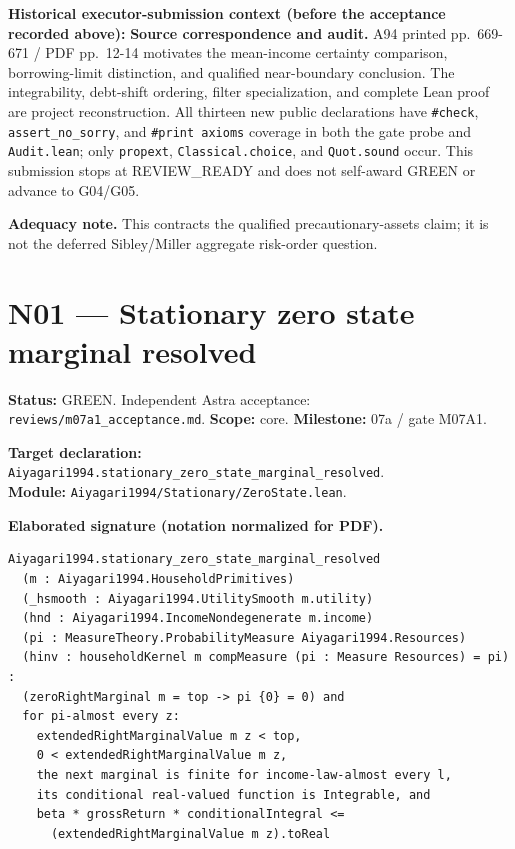 \documentclass[
  11pt,
]{article}
\let\LedgerOriginalTexttt\texttt
\renewcommand{\texttt}[1]{{\small\LedgerOriginalTexttt{#1}}}
\begin{document}
\textbf{Historical executor-submission context (before the acceptance
recorded above):} \textbf{Source correspondence and audit.} A94 printed
pp.~669-671 / PDF pp.~12-14 motivates the mean-income certainty
comparison, borrowing-limit distinction, and qualified near-boundary
conclusion. The integrability, debt-shift ordering, filter
specialization, and complete Lean proof are project reconstruction. All
thirteen new public declarations have \texttt{\#check},
\texttt{assert\_no\_sorry}, and \texttt{\#print\ axioms} coverage in
both the gate probe and \texttt{Audit.lean}; only \texttt{propext},
\texttt{Classical.choice}, and \texttt{Quot.sound} occur. This
submission stops at REVIEW\_READY and does not self-award GREEN or
advance to G04/G05.

\textbf{Adequacy note.} This contracts the qualified
precautionary-assets claim; it is not the deferred Sibley/Miller
aggregate risk-order question.

\section{N01 --- Stationary zero state marginal
resolved}\label{n01-stationary-zero-state-marginal-resolved}

\textbf{Status:} GREEN. Independent Astra acceptance:
\texttt{reviews/m07a1\_acceptance.md}. \textbf{Scope:} core.
\textbf{Milestone:} 07a / gate M07A1.

\textbf{Target declaration:}
\texttt{Aiyagari1994.stationary\_zero\_state\_marginal\_resolved}.\\
\textbf{Module:} \texttt{Aiyagari1994/Stationary/ZeroState.lean}.

\textbf{Elaborated signature (notation normalized for PDF).}

\begin{verbatim}
Aiyagari1994.stationary_zero_state_marginal_resolved
  (m : Aiyagari1994.HouseholdPrimitives)
  (_hsmooth : Aiyagari1994.UtilitySmooth m.utility)
  (hnd : Aiyagari1994.IncomeNondegenerate m.income)
  (pi : MeasureTheory.ProbabilityMeasure Aiyagari1994.Resources)
  (hinv : householdKernel m compMeasure (pi : Measure Resources) = pi) :
  (zeroRightMarginal m = top -> pi {0} = 0) and
  for pi-almost every z:
    extendedRightMarginalValue m z < top,
    0 < extendedRightMarginalValue m z,
    the next marginal is finite for income-law-almost every l,
    its conditional real-valued function is Integrable, and
    beta * grossReturn * conditionalIntegral <=
      (extendedRightMarginalValue m z).toReal
\end{verbatim}
\end{document}
